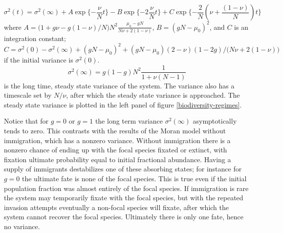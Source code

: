 \begin{equation*}
 \sigma^2(t) = \sigma^2(\infty) + A\exp\{-\frac{\nu}{N}t\} - B\exp\{-2\frac{\nu}{N}t\} + C\exp\{-\frac{2}{N}\left(\nu+\frac{(1-\nu)}{N}\right)t\}
\end{equation*}
where $A=\big(1+g\nu-g(1-\nu)/N\big)N^2\frac{\mu_0-gN}{N\nu+2(1-\nu)}$, $B=(gN-\mu_0)^2$, and $C$ is an integration constant; $C = \sigma^2(0) - \sigma^2(\infty) + (gN-\mu_0)^2 + (gN-\mu_0)(2-\nu)(1-2g)/\big(N\nu+2(1-\nu)\big)$ if the initial variance is $\sigma^2(0)$. 
\begin{equation}
\sigma^2(\infty) = g(1-g) N^2\frac{1}{1+\nu(N-1)}
\end{equation}
is the long time, steady state variance of the system. 
The variance also has a timescale set by $N/\nu$, after which the steady state variance is approached. 
The steady state variance is plotted in the left panel of figure \ref{biodiversity-regimes}. 


Notice that for $g=0$ or $g=1$ the long term variance $\sigma^2(\infty)$ asymptotically tends to zero. 
This contrasts with the results of the Moran model without immigration, which has a nonzero variance. 
Without immigration there is a nonzero chance of ending up with the focal species fixated or extinct, with fixation ultimate probability equal to initial fractional abundance. 
Having a supply of immigrants destabilizes one of these absorbing states; for instance for $g=0$ the ultimate fate is none of the focal species. %
This is true even if the initial population fraction was almost entirely of the focal species. If immigration is rare the system may temporarily fixate with the focal species, but with the repeated invasion attempts eventually a non-focal species will fixate, after which the system cannot recover the focal species. 
Ultimately there is only one fate, hence no variance. 

